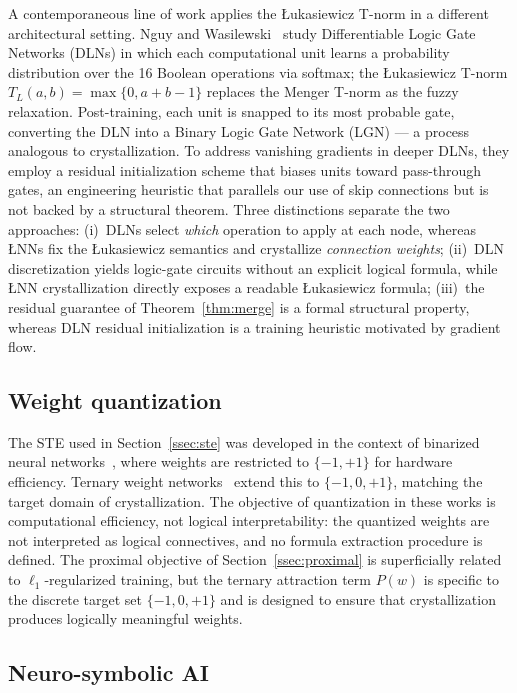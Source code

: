 \documentclass[lettersize,journal]{IEEEtran}
\newcommand{\LNN}{\L{}NN}
\begin{document}
A contemporaneous line of work applies the \L{}ukasiewicz T-norm in a
different architectural setting.
Nguy and Wasilewski~\cite{nguy2025} study Differentiable Logic Gate Networks
(DLNs) in which each computational unit learns a probability distribution over
the 16 Boolean operations via softmax; the \L{}ukasiewicz T-norm
$T_L(a,b)=\max\{0,a+b-1\}$ replaces the Menger T-norm as the fuzzy relaxation.
Post-training, each unit is snapped to its most probable gate, converting the
DLN into a Binary Logic Gate Network (LGN) --- a process analogous to
crystallization.
To address vanishing gradients in deeper DLNs, they employ a residual
initialization scheme that biases units toward pass-through gates, an
engineering heuristic that parallels our use of skip connections but is not
backed by a structural theorem.
Three distinctions separate the two approaches: (i)~DLNs select \emph{which}
operation to apply at each node, whereas \LNN{}s fix the Łukasiewicz
semantics and crystallize \emph{connection weights}; (ii)~DLN discretization
yields logic-gate circuits without an explicit logical formula, while \LNN{}
crystallization directly exposes a readable \L{}ukasiewicz formula;
(iii)~the residual guarantee of Theorem~\ref{thm:merge} is a formal
structural property, whereas DLN residual initialization is a training
heuristic motivated by gradient flow.

\subsection{Weight quantization}

The STE used in Section~\ref{ssec:ste} was developed in the context of
binarized neural networks~\cite{bengio2013,courbariaux2016}, where weights are
restricted to $\{-1, +1\}$ for hardware efficiency.
Ternary weight networks~\cite{li2016} extend this to $\{-1, 0, +1\}$,
matching the target domain of crystallization.
The objective of quantization in these works is computational efficiency,
not logical interpretability: the quantized weights are not interpreted as
logical connectives, and no formula extraction procedure is defined.
The proximal objective of Section~\ref{ssec:proximal} is superficially related
to $\ell_1$-regularized training, but the ternary attraction term $P(w)$
is specific to the discrete target set $\{-1, 0, +1\}$ and is designed to
ensure that crystallization produces logically meaningful weights.

\subsection{Neuro-symbolic AI}
\end{document}
